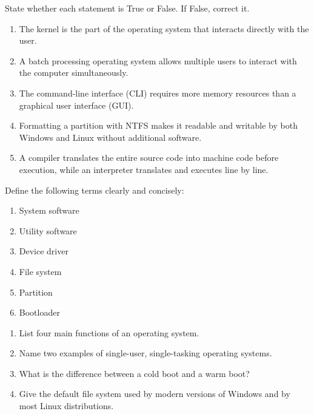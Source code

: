\documentclass[11pt]{article}
\newcounter{popsec}
\newcounter{popsub}
\newcommand{\courssub}[1]{%
  \stepcounter{popsub}%
  \par\vspace{9pt}\noindent{\popxbold\fontsize{11.5}{13}\selectfont\color{popink}{\color{poporange}\thepopsec.\thepopsub}\hspace{6pt}#1}\par\nopagebreak\vspace{4pt}
}
\begin{document}
\begin{exercice}
State whether each statement is True or False. If False, correct it.
\begin{enumerate}
\item The kernel is the part of the operating system that interacts directly with the user.
\item A batch processing operating system allows multiple users to interact with the computer simultaneously.
\item The command-line interface (CLI) requires more memory resources than a graphical user interface (GUI).
\item Formatting a partition with NTFS makes it readable and writable by both Windows and Linux without additional software.
\item A compiler translates the entire source code into machine code before execution, while an interpreter translates and executes line by line.
\end{enumerate}
\end{exercice}

\begin{exercice}[Definitions]
Define the following terms clearly and concisely:
\begin{enumerate}
\item System software
\item Utility software
\item Device driver
\item File system
\item Partition
\item Bootloader
\end{enumerate}
\end{exercice}

\begin{exercice}
\begin{enumerate}
\item List four main functions of an operating system.
\item Name two examples of single-user, single-tasking operating systems.
\item What is the difference between a cold boot and a warm boot?
\item Give the default file system used by modern versions of Windows and by most Linux distributions.
\end{enumerate}
\end{exercice}

\courssub{I practise}
\end{document}
